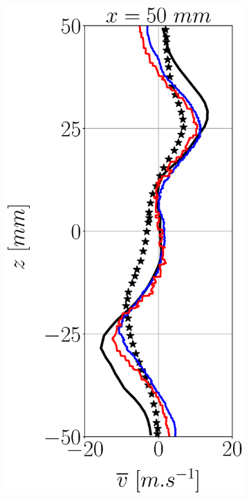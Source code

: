 \begin{figure}[h!]
\begin{subfigure}[b]{0.22\textwidth}
\end{subfigure}
\hfill
\begin{subfigure}[b]{0.22\textwidth}
	\centering
   \includegraphics[scale=0.25]{./part3_applications/figures_ch7_aero/BIMER_validation_quantitative_lines/x50_w_vertical_mean.eps} 

\end{subfigure}
\end{figure}
